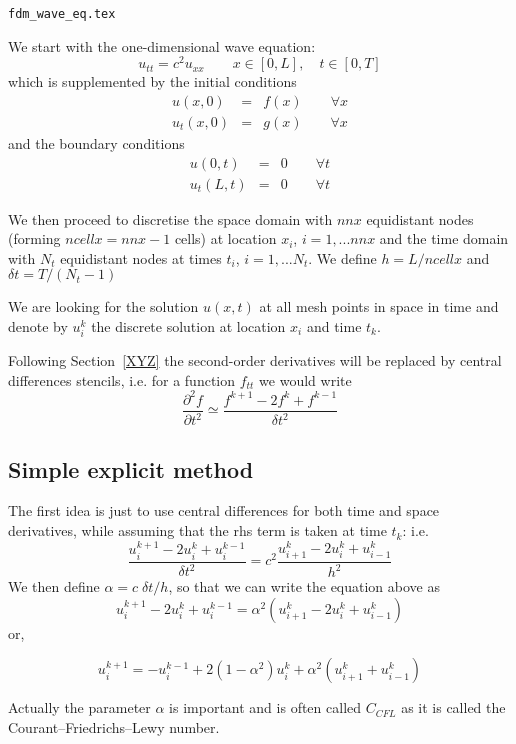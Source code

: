 
\begin{flushright} {\tiny {\color{gray} \tt fdm\_wave\_eq.tex}} \end{flushright}

We start with the one-dimensional wave equation:
\[
u_{tt}=c^2 u_{xx}  \qquad x\in[0,L], \quad t\in[0,T]
\]
which is supplemented by the initial conditions
\begin{eqnarray}
u(x,0) &=& f(x) \qquad  \forall x\\
u_t(x,0) &=& g(x) \qquad  \forall x
\end{eqnarray}
and the boundary conditions
\begin{eqnarray}
u(0,t) &=& 0 \qquad  \forall t\\
u_t(L,t) &=& 0 \qquad  \forall t \label{eq:fdm_wave_bc}
\end{eqnarray}


We then proceed to discretise the space domain with $nnx$ equidistant nodes (forming $ncellx=nnx-1$ cells)
at location $x_i$, $i=1,...nnx$ and the time domain with $N_t$ equidistant nodes at times
$t_i$, $i=1,...N_t$.
We define $h=L/ncellx$ and $\delta\! t=T/(N_t-1)$

We are looking for the solution $u(x,t)$ at all mesh points in space in time and denote by 
$u_i^k$ the discrete solution at location $x_i$ and time $t_k$.

Following Section~\ref{XYZ} the second-order derivatives will be replaced by central differences 
stencils, i.e. for a function $f_{tt}$ we would write
\[
\frac{\partial^2  f}{\partial t^2} \simeq \frac{ f^{k+1} -2f^{k} +f^{k-1}  }{\delta\! t^2}
\]

\subsection{Simple explicit method}
\label{ss:fdmwavess}

The first idea is just to use central differences for both time and space derivatives,
while assuming that the rhs term is taken at time $t_k$:
i.e.
\[
\frac{ u_i^{k+1} -2u_i^{k} +u_i^{k-1}  }{\delta\! t^2} = 
c^2
\frac{ u_{i+1}^k -2u_{i}^k +u_{i-1}^k  }{h^2} 
\]
We then define $\alpha = c\; \delta\! t / h$, so that we can write the equation above as
\begin{equation}
u_i^{k+1} -2u_i^{k} +u_i^{k-1}  = \alpha^2 (u_{i+1}^k -2u_{i}^k +u_{i-1}^k )
\label{eq:fdmwave1}
\end{equation}
or,
\begin{mdframed}[backgroundcolor=blue!5]
\begin{equation}
u_i^{k+1} = - u_i^{k-1} +2(1-\alpha^2) u_{i}^k + \alpha^2 (u_{i+1}^k +u_{i-1}^k ) 
\label{eq:wavee3}
\end{equation}
\end{mdframed}
Actually the parameter $\alpha$ is important and is often called $C_{CFL}$ as it is called the 
Courant–Friedrichs–Lewy number.


